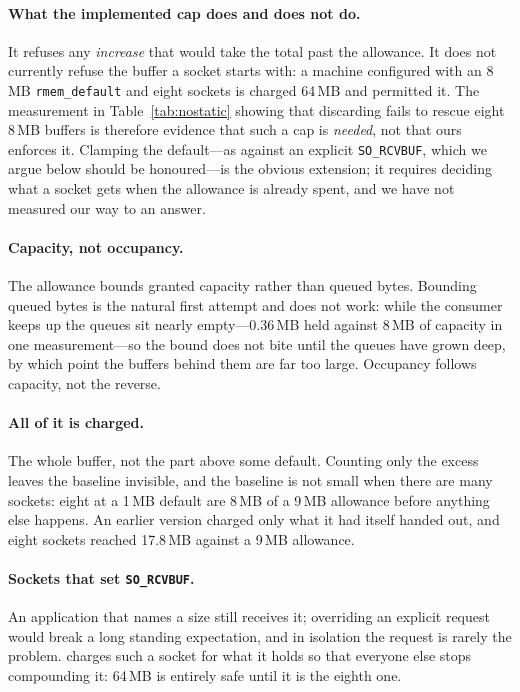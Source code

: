 \paragraph{What the implemented cap does and does not do.} It refuses any
\emph{increase} that would take the total past the allowance. It does not
currently refuse the buffer a socket starts with: a machine configured with an
8\,MB \texttt{rmem\_default} and eight sockets is charged 64\,MB and permitted
it. The measurement in Table~\ref{tab:nostatic} showing that discarding fails to
rescue eight 8\,MB buffers is therefore evidence that such a cap is
\emph{needed}, not that ours enforces it. Clamping the default---as against an
explicit \texttt{SO\_RCVBUF}, which we argue below should be honoured---is the
obvious extension; it requires deciding what a socket gets when the allowance is
already spent, and we have not measured our way to an answer.

\paragraph{Capacity, not occupancy.} The allowance bounds granted capacity
rather than queued bytes. Bounding queued bytes is the natural first attempt and
does not work: while the consumer keeps up the queues sit nearly empty---0.36\,MB
held against 8\,MB of capacity in one measurement---so the bound does not bite
until the queues have grown deep, by which point the buffers behind them are far
too large. Occupancy follows capacity, not the reverse.

\paragraph{All of it is charged.} The whole buffer, not the part above some
default. Counting only the excess leaves the baseline invisible, and the
baseline is not small when there are many sockets: eight at a 1\,MB default are
8\,MB of a 9\,MB allowance before anything else happens. An earlier version
charged only what it had itself handed out, and eight sockets reached 17.8\,MB
against a 9\,MB allowance.

\paragraph{Sockets that set \texttt{SO\_RCVBUF}.} An application that names a
size still receives it; overriding an explicit request would break a long
standing expectation, and in isolation the request is rarely the problem. \sys
charges such a socket for what it holds so that everyone else stops compounding
it: 64\,MB is entirely safe until it is the eighth one.

